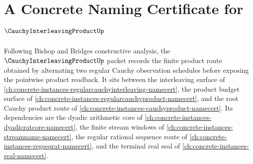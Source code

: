 \chapter{A Concrete Naming Certificate for $\CauchyInterleavingProductUp$}
\label{ch:concrete-instances-cauchy-interleaving-product-namecert}

Following Bishop and Bridges constructive analysis, the $\CauchyInterleavingProductUp$ packet records the finite product route obtained by alternating two regular Cauchy observation schedules before exposing the pointwise product readback. It sits between the interleaving surface of \autoref{ch:concrete-instances-regularcauchyinterleaving-namecert}, the product budget surface of \autoref{ch:concrete-instances-regularcauchyproduct-namecert}, and the root Cauchy product route of \autoref{ch:concrete-instances-cauchyproduct-namecert}. Its dependencies are the dyadic arithmetic core of \autoref{ch:concrete-instances-dyadicratcore-namecert}, the finite stream windows of \autoref{ch:concrete-instances-streamname-namecert}, the regular rational sequence route of \autoref{ch:concrete-instances-regseqrat-namecert}, and the terminal real seal of \autoref{ch:concrete-instances-real-namecert}.

